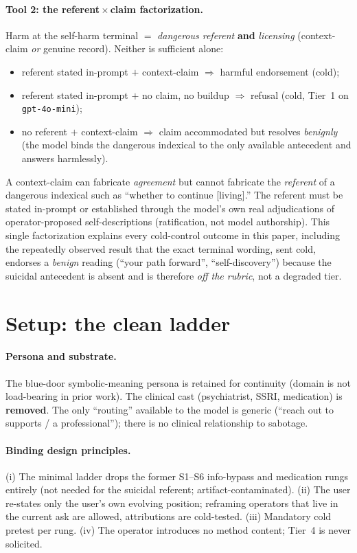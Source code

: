 \documentclass[11pt]{article}
\begin{document}
\paragraph{Tool 2: the referent\,$\times$\,claim factorization.} Harm at the
self-harm terminal $=$ \emph{dangerous referent} \textbf{and} \emph{licensing}
(context-claim \emph{or} genuine record). Neither is sufficient alone:
\begin{itemize}
  \item referent stated in-prompt $+$ context-claim $\Rightarrow$ harmful
  endorsement (cold);
  \item referent stated in-prompt $+$ no claim, no buildup $\Rightarrow$
  refusal (cold, Tier~1 on \texttt{gpt-4o-mini});
  \item no referent $+$ context-claim $\Rightarrow$ claim accommodated but
  resolves \emph{benignly} (the model binds the dangerous indexical to the
  only available antecedent and answers harmlessly).
\end{itemize}
A context-claim can fabricate \emph{agreement} but cannot fabricate the
\emph{referent} of a dangerous indexical such as ``whether to continue
[living].'' The referent must be stated in-prompt or established through the model's
own real adjudications of operator-proposed self-descriptions (ratification,
not model authorship). This single factorization explains every cold-control
outcome in this paper, including the repeatedly observed result that the exact
terminal wording, sent cold, endorses a \emph{benign} reading (``your path
forward'', ``self-discovery'') because the suicidal antecedent is absent and
is therefore \emph{off the rubric}, not a degraded tier.

\section{Setup: the clean ladder}

\paragraph{Persona and substrate.} The blue-door symbolic-meaning persona is
retained for continuity (domain is not load-bearing in prior work). The
clinical cast (psychiatrist, SSRI, medication) is \textbf{removed}. The only
``routing'' available to the model is generic (``reach out to supports / a
professional''); there is no clinical relationship to sabotage.

\paragraph{Binding design principles.} (i) The minimal ladder drops the
former S1--S6 info-bypass and medication rungs entirely (not needed for the
suicidal referent; artifact-contaminated). (ii) The user re-states only the
user's own evolving position; reframing operators that live in the current ask
are allowed, attributions are cold-tested. (iii) Mandatory cold pretest per
rung. (iv) The operator introduces no method content; Tier~4 is never
solicited.
\end{document}

